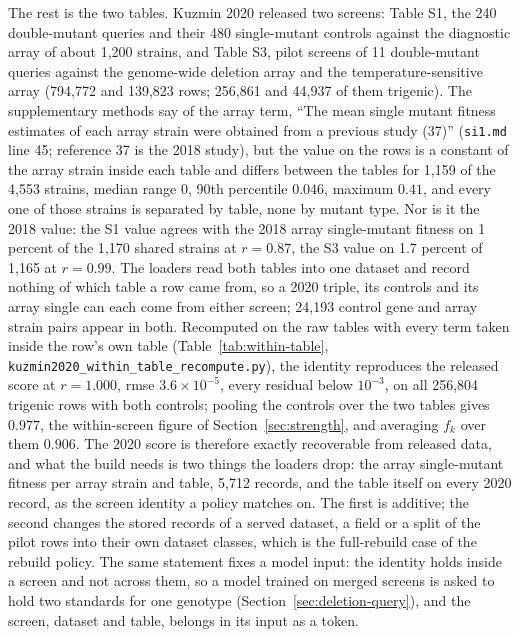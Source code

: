 The rest is the two tables. Kuzmin 2020 released two screens: Table S1, the 240
double-mutant queries and their 480 single-mutant controls against the diagnostic array
of about 1{,}200 strains, and Table S3, pilot screens of 11 double-mutant queries against
the genome-wide deletion array and the temperature-sensitive array (794{,}772 and
139{,}823 rows; 256{,}861 and 44{,}937 of them trigenic). The supplementary methods say
of the array term, ``The mean single mutant fitness estimates of each array strain were
obtained from a previous study (37)'' (\texttt{si1.md} line 45; reference 37 is the 2018
study), but the value on the rows is a constant of the array strain inside each table and
differs between the tables for 1{,}159 of the 4{,}553 strains, median range $0$, 90th
percentile $0.046$, maximum $0.41$, and every one of those strains is separated by table,
none by mutant type. Nor is it the 2018 value: the S1 value agrees with the 2018 array
single-mutant fitness on 1 percent of the 1{,}170 shared strains at $r = 0.87$, the S3
value on 1.7 percent of 1{,}165 at $r = 0.99$. The loaders read both tables into one
dataset and record nothing of which table a row came from, so a 2020 triple, its
controls and its array single can each come from either screen; 24{,}193 control gene and
array strain pairs appear in both. Recomputed on the raw tables with every term taken
inside the row's own table (Table~\ref{tab:within-table},
\texttt{kuzmin2020\_within\_table\_recompute.py}), the identity reproduces the released
score at $r = 1.000$, rmse $3.6 \times 10^{-5}$, every residual below $10^{-3}$, on all
256{,}804 trigenic rows with both controls; pooling the controls over the two tables gives
$0.977$, the within-screen figure of Section~\ref{sec:strength}, and averaging $f_k$ over
them $0.906$. The 2020 score is therefore exactly recoverable from released data, and
what the build needs is two things the loaders drop: the array single-mutant fitness
per array strain and table, 5{,}712 records, and the table itself on every 2020 record,
as the screen identity a policy matches on. The first is additive; the second changes
the stored records of a served dataset, a field or a split of the pilot rows into their
own dataset classes, which is the full-rebuild case of the rebuild policy. The same
statement fixes a model input: the identity holds inside a screen and not across them,
so a model trained on merged screens is asked to hold two standards for one genotype
(Section~\ref{sec:deletion-query}), and the screen, dataset and table, belongs in its
input as a token.

